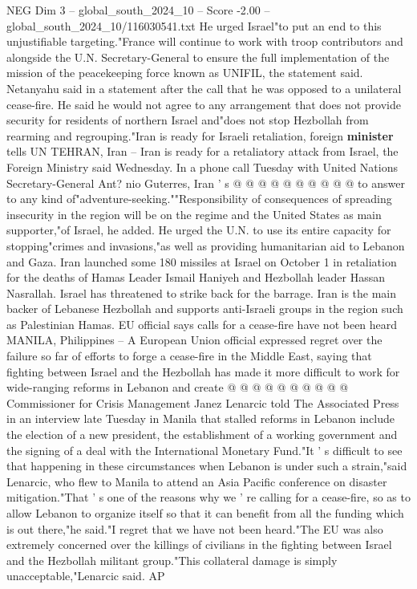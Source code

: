 \begin{textsample}{NEG Dim 3 – global\_south\_2024\_10 – Score -2.00 – global\_south\_2024\_10/116030541.txt}
He urged Israel"to put an end to this unjustifiable targeting."France will continue to work with troop contributors and alongside the U.N.
Secretary-General to ensure the full implementation of the mission of the peacekeeping force known as UNIFIL, the statement said.
Netanyahu said in a statement after the call that he was opposed to a unilateral cease-fire.
He said he would not agree to any arrangement that does not provide security for residents of northern Israel and"does not stop Hezbollah from rearming and regrouping."Iran is ready for Israeli retaliation, foreign \textbf{minister} tells UN TEHRAN, Iran -- Iran is ready for a retaliatory attack from Israel, the Foreign Ministry said Wednesday.
In a phone call Tuesday with United Nations Secretary-General Ant? nio Guterres, Iran ' s @ @ @ @ @ @ @ @ @ @ to answer to any kind of"adventure-seeking.""Responsibility of consequences of spreading insecurity in the region will be on the regime and the United States as main supporter,"of Israel, he added.
He urged the U.N. to use its entire capacity for stopping"crimes and invasions,"as well as providing humanitarian aid to Lebanon and Gaza.
Iran launched some 180 missiles at Israel on October 1 in retaliation for the deaths of Hamas Leader Ismail Haniyeh and Hezbollah leader Hassan Nasrallah.
Israel has threatened to strike back for the barrage.
Iran is the main backer of Lebanese Hezbollah and supports anti-Israeli groups in the region such as Palestinian Hamas.
EU official says calls for a cease-fire have not been heard MANILA, Philippines -- A European Union official expressed regret over the failure so far of efforts to forge a cease-fire in the Middle East, saying that fighting between Israel and the Hezbollah has made it more difficult to work for wide-ranging reforms in Lebanon and create @ @ @ @ @ @ @ @ @ @ Commissioner for Crisis Management Janez Lenarcic told The Associated Press in an interview late Tuesday in Manila that stalled reforms in Lebanon include the election of a new president, the establishment of a working government and the signing of a deal with the International Monetary Fund."It ' s difficult to see that happening in these circumstances when Lebanon is under such a strain,"said Lenarcic, who flew to Manila to attend an Asia Pacific conference on disaster mitigation."That ' s one of the reasons why we ' re calling for a cease-fire, so as to allow Lebanon to organize itself so that it can benefit from all the funding which is out there,"he said."I regret that we have not been heard."The EU was also extremely concerned over the killings of civilians in the fighting between Israel and the Hezbollah militant group."This collateral damage is simply unacceptable,"Lenarcic said.
AP

\end{textsample}
